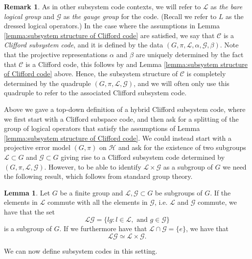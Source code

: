 \documentclass[11pt]{article}
\theoremstyle{definition}
\newtheorem{lemma}{Lemma}
\newtheorem*{remark}{Remark}
\newcommand{\calC}{\mathcal{C}}
\newcommand{\calG}{\mathcal{G}}
\newcommand{\calH}{\mathcal{H}}
\newcommand{\calL}{\mathcal{L}}
\begin{document}
\begin{remark} 
    As in other subsystem code contexts, we will refer to $\calL$ as \emph{the bare logical group} and $\calG$ as \emph{the gauge group} for the code. (Recall we refer to $L$ as the dressed logical operators.) In the case where the assumptions in Lemma \ref{lemma:subsystem structure of Clifford code} are satisfied, we say that $\calC$ is a \emph{Clifford subsystem code}, and it is defined by the data $(G,\pi,\calL,\alpha,\calG,\beta)$. Note that the projective representations $\alpha$ and $\beta$ are uniquely determined by the fact that $\calC$ is a Clifford code, this follows by \cite[Corollary 5.4]{Eidesen2025} and Lemma \ref{lemma:subsystem structure of Clifford code} above. Hence, the subsystem structure of $\calC$ is completely determined by the quadruple $(G,\pi,\calL,\calG)$, and we will often only use this quadruple to refer to the associated Clifford subsystem code.
\end{remark} 

Above we gave a top-down definition of a hybrid Clifford subsystem code, where we first start with a Clifford subspace code, and then ask for a splitting of the group of logical operators that satisfy the assumptions of Lemma \ref{lemma:subsystem structure of Clifford code}. We could instead start with a projective error model $(G,\pi)$ on $\calH$ and ask for the existence of two subgroups $\calL \subset G$ and $\calG \subset G$ giving rise to a Clifford subsystem code determined by $(G,\pi,\calL,\calG)$. However, to be able to identify $\calL \times \calG$ as a subgroup of $G$ we need the following result, which follows from standard group theory.

\begin{lemma}\label{lemma:criteria for product subgroup}
    Let $G$ be a finite group and $\calL,\calG \subset G$ be subgroups of $G$. If the elements in $\calL$ commute with all the elements in $\calG$, i.e. $\calL$ and $\calG$ commute, we have that the set
    \begin{equation*}
        \calL \calG = \{ lg : l \in \calL, \text{ and } g \in \calG \}
    \end{equation*}
    is a subgroup of $G$. If we furthermore have that $\calL \cap \calG = \{e\}$, we have that
    \begin{equation*}
        \calL\calG \simeq \calL \times \calG.
    \end{equation*}
\end{lemma}

We can now define subsystem codes in this setting. 
\end{document}
